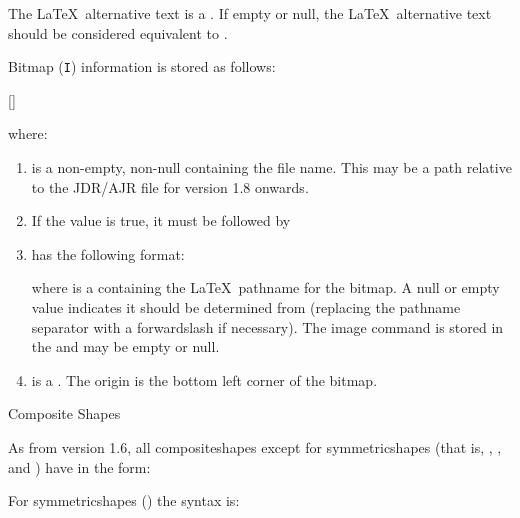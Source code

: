 \begin{numbered}
\begin{enumerate}
  The \LaTeX\ alternative text  is a .
  If empty or null, the \LaTeX\ alternative text should be considered equivalent
  to .
  \end{enumerate}%

\item\label{jdr:bitmap} Bitmap (\texttt{I}) information is stored as follows:
\begin{syntaxline}
  []
\end{syntaxline}
where:
  \begin{enumerate}
  \item {} is a non-empty, non-null 
  containing the file name. This may be a path relative to the
  \gls{JDR}\slash\gls{AJR} file for version 1.8 onwards.

  \item If the  value  is true, it must
  be followed by 

  \item\label{jdr:latexbitmap}
   has the following format:
  \begin{syntaxline}
  \end{syntaxline}
  where  is a  containing the \LaTeX\
  pathname for the bitmap. A null or empty value indicates it should
  be determined from \meta{filename} (replacing the pathname
  separator with a \gls{forwardslash} if necessary). The image command is stored
  in the \type{string} \meta{imgcmd} and may be empty or null.

  \item {} is a . The origin
  is the bottom left corner of the \gls{bitmap}.
  \end{enumerate}%

\item \label{jdr:composite}Composite Shapes

As from version 1.6, all \glspl{compositeshape} except
for \glspl{symmetricshape} (that is, 
\hyperref[jdr:textpath]{},
\hyperref[jdr:rotational]{},
\hyperref[jdr:scaled]{} and 
\hyperref[jdr:spiral]{}) have  in
the form:
\begin{syntaxline}
 
\end{syntaxline}
For \glspl{symmetricshape} (\hyperref[jdr:symmetric]{\code{S}}) the syntax is:
\begin{syntaxline}
 
\end{syntaxline}


\end{numbered}
